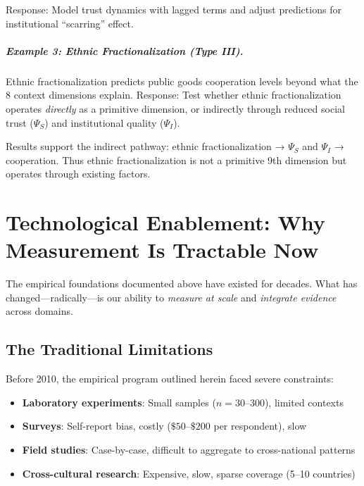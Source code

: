 \documentclass[12pt,oneside]{book}
\begin{document}
Response: Model trust dynamics with lagged terms and adjust predictions for institutional
``scarring'' effect.

\paragraph{Example 3: Ethnic Fractionalization (Type III).}

Ethnic fractionalization predicts public goods cooperation levels beyond what the 8 context
dimensions explain. Response: Test whether ethnic fractionalization operates \emph{directly}
as a primitive dimension, or indirectly through reduced social trust ($\Psi_S$) and institutional
quality ($\Psi_I$).

Results support the indirect pathway: ethnic fractionalization → $\Psi_S$ and $\Psi_I$ → cooperation.
Thus ethnic fractionalization is not a primitive 9th dimension but operates through existing factors.

\chapter{Technological Enablement: Why Measurement Is Tractable Now}
\label{sec:technology}

The empirical foundations documented above have existed for decades. What has changed—radically—is
our ability to \emph{measure at scale} and \emph{integrate evidence} across domains.

\section{The Traditional Limitations}

Before 2010, the empirical program outlined herein faced severe constraints:

\begin{itemize}
  \item \textbf{Laboratory experiments}: Small samples ($n = 30$--$300$), limited contexts
  \item \textbf{Surveys}: Self-report bias, costly ($\$50$--$\$200$ per respondent), slow
  \item \textbf{Field studies}: Case-by-case, difficult to aggregate to cross-national patterns
  \item \textbf{Cross-cultural research}: Expensive, slow, sparse coverage (5--10 countries)
\end{itemize}
\end{document}
